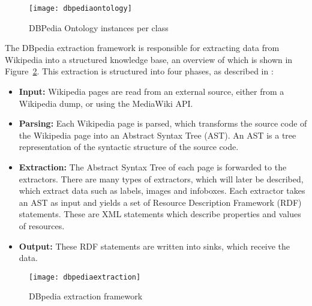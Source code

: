 \begin{figure}[h]
	\begin{center}
		\texttt{[image: dbpediaontology]}
	\end{center}
	\caption{DBPedia Ontology instances per class \cite{dbpedia2019ontology}}
	\label{fig:ontology}
\end{figure}

The DBpedia extraction framework is responsible for extracting data from Wikipedia into a structured knowledge base, an overview of which is shown in Figure~\ref{fig:extraction}. This extraction is structured into four phases, as described in \cite{lehmann2015dbpedia}:

\begin{itemize}[label={},itemindent=-2em,leftmargin=2em]
	\item {\bf Input:} Wikipedia pages are read from an external source, either from a Wikipedia dump, or using the MediaWiki API.
	\item {\bf Parsing:} Each Wikipedia page is parsed, which transforms the source code of the Wikipedia page into an Abstract Syntax Tree (AST). An AST is a tree representation of the syntactic structure of the source code.
	\item {\bf Extraction:} The Abstract Syntax Tree of each page is forwarded to the extractors. There are many types of extractors, which will later be described, which extract data such as labels, images and infoboxes. Each extractor takes an AST as input and yields a set of Resource Description Framework (RDF) statements. These are XML statements which describe properties and values of resources.
	\item {\bf Output:} These RDF statements are written into sinks, which receive the data.
\end{itemize}

\begin{figure}[h]
	\begin{center}
		\texttt{[image: dbpediaextraction]}
	\end{center}
	\caption{DBpedia extraction framework \cite{bizer2009dbpedia}}
	\label{fig:extraction}
\end{figure}

